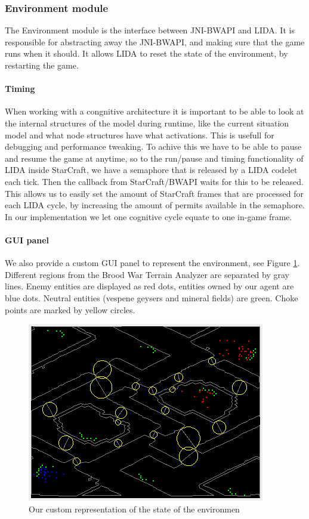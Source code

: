 \subsubsection{Environment module}
The Environment module is the interface between JNI-BWAPI and LIDA. It is responsible for abstracting away the JNI-BWAPI, and making sure that the game runs when it should. It allows LIDA to reset the state of the environment, by restarting the game.
\paragraph{Timing} When working with a congnitive architecture it is important to be able to look at the internal structures of the model during runtime, like the current situation model and what node structures have what activations. This is usefull for debugging and performance tweaking. To achive this we have to be able to pause and resume the game at anytime, so to the run/pause and timing functionality of LIDA inside StarCraft, we have a semaphore that is released by a LIDA codelet each tick. Then the callback from StarCraft/BWAPI waits for this to be released. This allows us to easily set the amount of StarCraft frames that are processed for each LIDA cycle, by increasing the amount of permits available in the semaphore. In our implementation we let one cognitive cycle equate to one in-game frame.

\paragraph{GUI panel} We also provide a custom GUI panel to represent the environment, see Figure \ref{fig:environment-gui}. Different regions from the Brood War Terrain Analyzer are separated by gray lines. Enemy entities are displayed as red dots, entities owned by our agent are blue dots. Neutral entities (vespene geysers and mineral fields) are green. Choke points are marked by yellow circles.

\begin{figure}[h!tb]
\centering
\includegraphics{graphics/environment-gui.png}
\caption{Our custom representation of the state of the environmen}
\label{fig:environment-gui}
\end{figure}

